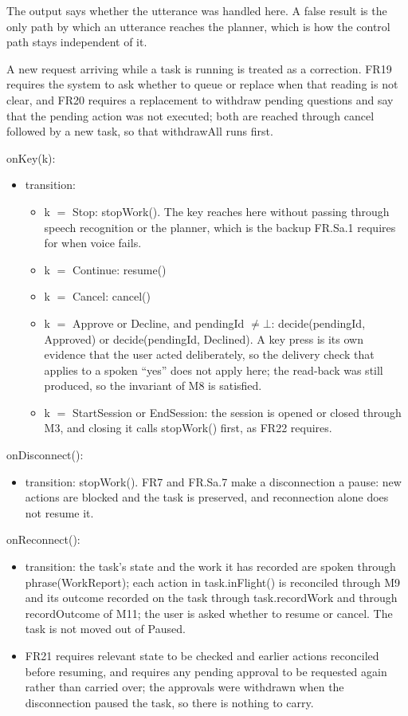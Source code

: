 \documentclass[12pt, titlepage]{article}
\newcommand{\nil}{\bot}
\begin{document}
\noindent The output says whether the utterance was handled here. A false result
is the only path by which an utterance reaches the planner, which is how the
control path stays independent of it.

\noindent A new request arriving while a task is running is treated as a
correction. FR19 requires the system to ask whether to queue or replace when
that reading is not clear, and FR20 requires a replacement to withdraw pending
questions and say that the pending action was not executed; both are reached
through cancel followed by a new task, so that withdrawAll runs first.

\noindent onKey(k):
\begin{itemize}
\item transition:
\begin{itemize}
\item k $=$ Stop: stopWork(). The key reaches here without passing through
speech recognition or the planner, which is the backup FR.Sa.1 requires for when
voice fails.
\item k $=$ Continue: resume()
\item k $=$ Cancel: cancel()
\item k $=$ Approve or Decline, and pendingId $\neq \nil$: decide(pendingId,
Approved) or decide(pendingId, Declined). A key press is its own evidence that
the user acted deliberately, so the delivery check that applies to a spoken
``yes'' does not apply here; the read-back was still produced, so the invariant
of M8 is satisfied.
\item k $=$ StartSession or EndSession: the session is opened or closed through
M3, and closing it calls stopWork() first, as FR22 requires.
\end{itemize}
\end{itemize}

\noindent onDisconnect():
\begin{itemize}
\item transition: stopWork(). FR7 and FR.Sa.7 make a disconnection a pause: new
actions are blocked and the task is preserved, and reconnection alone does not
resume it.
\end{itemize}

\noindent onReconnect():
\begin{itemize}
\item transition: the task's state and the work it has recorded are spoken
through phrase(WorkReport); each action in task.inFlight() is reconciled through
M9 and its outcome recorded on the task through task.recordWork and through
recordOutcome of M11; the user is
asked whether to resume or cancel. The task is not moved out of Paused.
\item FR21 requires relevant state to be checked and earlier actions reconciled
before resuming, and requires any pending approval to be requested again rather
than carried over; the approvals were withdrawn when the disconnection paused
the task, so there is nothing to carry.
\end{itemize}
\end{document}
